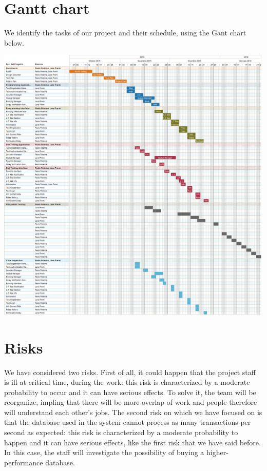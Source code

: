 \section{Gantt chart}
We identify the tasks of our project and their schedule, using the Gant chart below.
		\begin{center}
			\includegraphics[width=1\textwidth]{./images/myTaxiService.png}
		\end{center}
\section{Risks}
We have considered two risks. First of all, it could happen that the project staff is ill at critical time, during the work: this risk is characterized by a moderate probability to occur and it can have serious effects. To solve it, the team will be reorganize, impling that there will be more overlap of work and people therefore will understand each other's jobs.
The second risk on which we have focused on is that the database used in the system cannot process as many transactions per second as expected: this risk is characterized by a moderate probability to happen and it can have serious effects, like the first risk that we have said before. In this case, the staff will investigate the possibility of buying a higher-performance database.
	